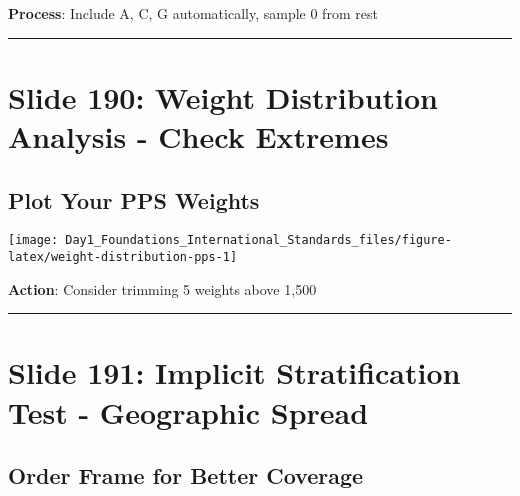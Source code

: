\documentclass[
]{article}
\begin{document}
\textbf{Process}: Include A, C, G automatically, sample 0 from rest

\begin{center}\rule{0.5\linewidth}{0.5pt}\end{center}

\section{Slide 190: Weight Distribution Analysis - Check
Extremes}\label{slide-190-weight-distribution-analysis---check-extremes}

\subsection{Plot Your PPS Weights}\label{plot-your-pps-weights}

\texttt{[image: Day1\_Foundations\_International\_Standards\_files/figure-latex/weight-distribution-pps-1]}

\textbf{Action}: Consider trimming 5 weights above 1,500

\begin{center}\rule{0.5\linewidth}{0.5pt}\end{center}

\section{Slide 191: Implicit Stratification Test - Geographic
Spread}\label{slide-191-implicit-stratification-test---geographic-spread}

\subsection{Order Frame for Better
Coverage}\label{order-frame-for-better-coverage}
\end{document}
